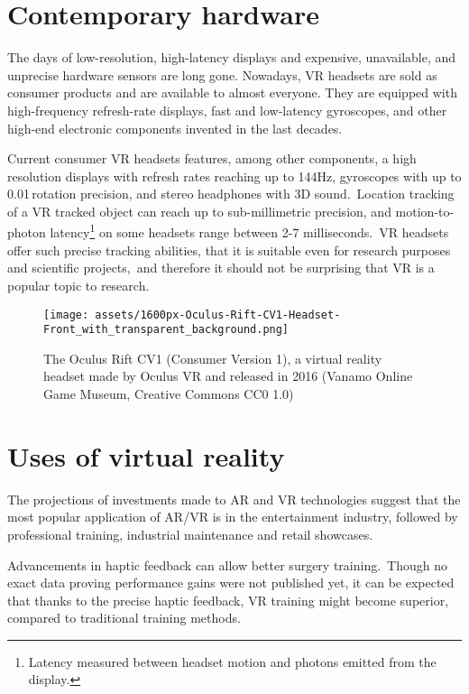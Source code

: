 \section{Contemporary hardware}
The days of low-resolution, high-latency displays and expensive, unavailable,
and unprecise hardware sensors are long gone. Nowadays, VR headsets are
sold as consumer products and are available to almost everyone. They are
equipped with high-frequency refresh-rate displays, fast and low-latency
gyroscopes, and other high-end electronic components invented in the last
decades.

Current consumer VR headsets features, among other components,
a high resolution displays with refresh rates reaching up to 144Hz,
\cite{vlvindx} gyroscopes with up to 0.01\degree\,rotation precision, 
and stereo headphones with 3D sound.\,\cite{vivenasa}
Location tracking of a VR tracked object can reach up to sub-millimetric precision, 
and motion-to-photon latency\footnote{Latency measured between headset motion and photons emitted from the display.}
on some headsets range between 2-7 milliseconds.\,\cite{mtpltc}\cite{xinwiki}
VR headsets offer such precise tracking abilities, that it is suitable even
for research purposes and scientific projects,\,\cite{vivepbsr} and therefore
it should not be surprising that VR is a popular topic to research.


\begin{figure}[h]{}
\centering\texttt{[image: assets/1600px-Oculus-Rift-CV1-Headset-Front\_with\_transparent\_background.png]}
\caption{The Oculus Rift CV1 (Consumer Version 1), a virtual reality headset made by Oculus VR and released in 2016 
    (Vanamo Online Game Museum, Creative Commons CC0 1.0)}
\end{figure}

\section{Uses of virtual reality}
The projections of investments made to AR and VR technologies suggest
that the most popular application of AR/VR is in the entertainment industry,
followed by professional training, industrial maintenance and retail showcases.
\cite{statistavr}


Advancements in haptic feedback can allow better surgery training.\,\cite{vhfcrmisvrt}
Though no exact data proving performance gains
were not published yet, it can be expected that thanks to the precise haptic
feedback, VR training might become superior, compared to traditional
training methods.\,\cite{vrsrgr}


